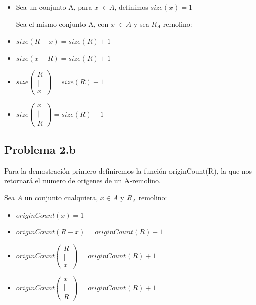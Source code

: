 \documentclass[12pt]{article}
\begin{document}
\begin{itemize}
    \item Sea un conjunto A, para $x$ $\in A$, definimos $size(x) = 1$
    
    Sea el mismo conjunto A, con $x$ $\in A$ y sea $R_A$ remolino: 
    
    \item $size(R - x) = size(R) + 1$
    \item $size (x - R) = size(R) + 1$
    \item 
           $size\left(\begin{matrix}
           R\\
           |\\
           x
         \end{matrix}\right) = size(R) + 1$
    \item 
           $size\left(\begin{matrix}
           x\\
           |\\
           R
         \end{matrix}\right) = size(R) + 1$
\end{itemize}

\newpage

\subsection*{Problema 2.b}

Para la demostración primero definiremos la función originCount(R), la que nos retornará el numero de origenes de un A-remolino. 

Sea $A$ un conjunto cualquiera, $x \in A$ y $R_A$ remolino:
\begin{itemize}
    \item $originCount(x) = 1$
    \item $originCount(R - x) = originCount(R) + 1$
    \item 
           $originCount\left(\begin{matrix}
           R\\
           |\\
           x
         \end{matrix}\right) = originCount(R) + 1$
    \item 
           $originCount\left(\begin{matrix}
           x\\
           |\\
           R
         \end{matrix}\right) = originCount(R) + 1$
\end{itemize}
\end{document}
